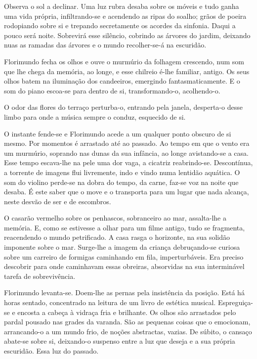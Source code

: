 Observa o sol a declinar. Uma luz rubra desaba sobre os móveis e tudo
ganha uma vida própria, infiltrando-se e acendendo as ripas do soalho;
grãos de poeira rodopiando sobre si e trepando secretamente os acordes
da sinfonia. Daqui a pouco será noite. Sobrevirá esse silêncio, cobrindo
as árvores do jardim, deixando nuas as ramadas das árvores e o mundo
recolher-se-á na escuridão.

Florimundo fecha os olhos e ouve o murmúrio da folhagem crescendo, num
som que lhe chega da memória, ao longe, e esse chilreio é-lhe familiar,
antigo. Os seus olhos batem na iluminação dos candeeiros, emergindo
fantasmaticamente. E o som do piano escoa-se para dentro de si,
transformando-o, acolhendo-o.

O odor das flores do terraço perturba-o, entrando pela janela,
desperta-o desse limbo para onde a música sempre o conduz, esquecido de
si.

O instante fende-se e Florimundo acede a um qualquer ponto obscuro de si
mesmo. Por momentos é arrastado até ao passado. Ao tempo em que o vento
era um murmúrio, soprando nas dunas da sua infância, ao longe
avistando-se a casa. Esse tempo escava-lhe na pele uma dor vaga, a
cicatriz reabrindo-se. Descontínua, a torrente de imagens flui
livremente, indo e vindo numa lentidão aquática. O som do violino
perde-se na dobra do tempo, da carne, faz-se voz na noite que desaba. É
este saber que o move e o transporta para um lugar que nada alcança,
neste desvão de ser e de escombros.

O casarão vermelho sobre os penhascos, sobranceiro ao mar, assalta-lhe a
memória. E, como se estivesse a olhar para um filme antigo, tudo se
fragmenta, reacendendo o mundo petrificado. A casa rasga o horizonte, na
sua solidão imponente sobre o mar. Surge-lhe a imagem da criança
debruçando-se curiosa sobre um carreiro de formigas caminhando em fila,
imperturbáveis. Era preciso descobrir para onde caminhavam essas
obreiras, absorvidas na sua interminável tarefa de sobrevivência.

Florimundo levanta-se. Doem-lhe as pernas pela insistência da posição.
Está há horas sentado, concentrado na leitura de um livro de estética
musical. Espreguiça-se e encosta a cabeça à vidraça fria e brilhante. Os
olhos são arrastados pelo pardal pousado nas grades da varanda. São as
pequenas coisas que o emocionam, arrancando-o a um mundo frio, de noções
abstractas, vazias. De súbito, o cansaço abate-se sobre si, deixando-o
suspenso entre a luz que deseja e a sua própria escuridão. Essa luz do
passado.


